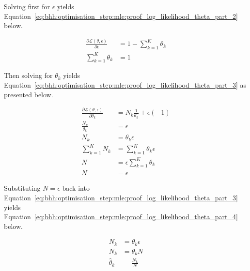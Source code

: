 Solving first for $\epsilon$ yields Equation~\eqref{eq:bhh:optimisation_step:mle:proof_log_likelihood_theta_part_2} below.

\begin{equation}
      \label{eq:bhh:optimisation_step:mle:proof_log_likelihood_theta_part_2}
      \begin{split}
            \frac{\partial \mathcal{L}(\theta, \epsilon)}{\partial \epsilon} &= 1 - \sum_{k=1}^{K} \theta_{k}  \\
            \sum_{k=1}^{K} \theta_{k}  &= 1
      \end{split}
\end{equation}

Then solving for $\theta_{k}$ yields Equation~\eqref{eq:bhh:optimisation_step:mle:proof_log_likelihood_theta_part_3} as presented below.

\begin{equation}
      \label{eq:bhh:optimisation_step:mle:proof_log_likelihood_theta_part_3}
      \begin{split}
            \frac{\partial \mathcal{L}(\theta, \epsilon)}{\partial \theta_{k}} &=  N_{k} \frac{1}{\theta_{k}}  + \epsilon(-1) \\
            \frac{N_{k}}{\theta_{k}} &= \epsilon \\
            N_{k} &= \theta_{k} \epsilon \\
            \sum_{k=1}^{K} N_{k} &= \sum_{k=1}^{K} \theta_{k} \epsilon \\
            N &= \epsilon \sum_{k=1}^{K} \theta_{k} \\
            N &= \epsilon
      \end{split}
\end{equation}

Substituting $N = \epsilon$ back into Equation~\eqref{eq:bhh:optimisation_step:mle:proof_log_likelihood_theta_part_3} yields Equation~\eqref{eq:bhh:optimisation_step:mle:proof_log_likelihood_theta_part_4} below.

\begin{equation}
      \label{eq:bhh:optimisation_step:mle:proof_log_likelihood_theta_part_4}
      \begin{split}
            N_{k} &= \theta_{k} \epsilon \\
            N_{k} &= \theta_{k} N \\
            \hat{\theta}_{k} &= \frac{N_{k}}{N}\\
      \end{split}
\end{equation}

